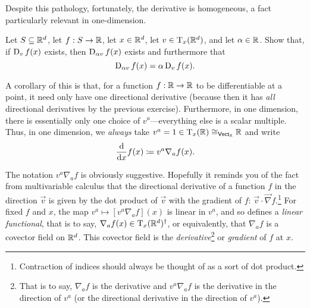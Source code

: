 \begin{dfn}
\begin{rmk}
Despite this pathology, fortunately, the derivative is homogeneous, a fact particularly relevant in one-dimension.
\end{rmk}
\begin{exr}
Let $S\subseteq \R ^d$, let $f:S\rightarrow \R$, let $x\in \R ^d$, let $v\in \tangent{\R ^d}{x}$, and let $\alpha \in \R$.  Show that, if $\D _vf(x)$ exists, then $\D _{\alpha v}f(x)$ exists and furthermore that
\begin{equation}
\D _{\alpha v}f(x)=\alpha \D _vf(x).
\end{equation}
\end{exr}
\begin{rmk}
A corollary of this is that, for a function $f:\R \rightarrow \R$ to be differentiable at a point, it need only have one directional derivative (because then it has \emph{all} directional derivatives by the previous exercise).  Furthermore, in one dimension, there is essentially only one choice of $v^a$---everything else is a scalar multiple.  Thus, in one dimension, we \emph{always} take $v^a=1\in \tangent{\R}{x}\cong _{\Vect _\R}\R$ and write
\begin{equation}
\frac{\dif}{\dif x}f(x)\coloneqq v^a\nabla _af(x).
\end{equation}
\end{rmk}
\begin{rmk}
The notation $v^a\nabla _af$ is obviously suggestive.  Hopefully it reminds you of the fact from multivariable calculus that the directional derivative of a function $f$ in the direction $\vec{v}$ is given by the dot product of $\vec{v}$ with the gradient of $f$:  $\vec{v}\cdot \vec{\nabla}f$.\footnote{Contraction of indices should always be thought of as a sort of dot product.}  For fixed $f$ and $x$, the map $v^a\mapsto [v^a\nabla _af](x)$ is linear in $v^a$, and so defines a \emph{linear functional}, that is to say, $\nabla _af(x)\in \tangent{\R ^d}{x}^{\dagger}$, or equivalently, that $\nabla _af$ is a covector field on $\R ^d$.  This covector field is the \emph{derivative}\footnote{That is to say, $\nabla _af$ is the derivative and $v^a\nabla _af$ is the derivative in the direction of $v^a$ (or the directional derivative in the direction of $v^a$).} or \emph{gradient} of $f$ at $x$.
\end{rmk}
\begin{rmk}

\end{rmk}
\end{dfn}
